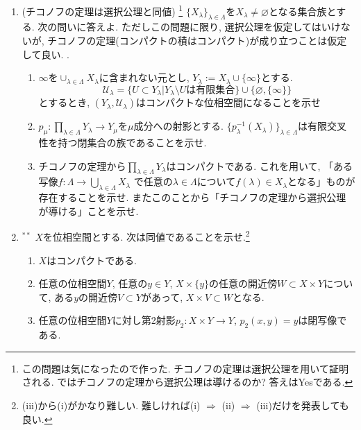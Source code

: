 \documentclass[dvipdfmx,a4paper,11pt]{article}
\newcommand{\R}{\mathbb{R}}
\theoremstyle{definition}
\begin{document}
\begin{enumerate}[label=\textbf{問}\ref*{sec-compact}.\arabic*]
\item \label{axiom}(チコノフの定理は選択公理と同値) \footnote{この問題は気になったので作った. チコノフの定理は選択公理を用いて証明される. ではチコノフの定理から選択公理は導けるのか? 答えはYesである.}
$\{X_{\lambda} \}_{\lambda \in \Lambda}$を$X_{\lambda} \neq \varnothing$となる集合族とする.
次の問いに答えよ. ただしこの問題に限り, 選択公理を仮定してはいけないが, チコノフの定理(コンパクトの積はコンパクト)が成り立つことは仮定して良い. .
\begin{enumerate}
 \setlength{\parskip}{0cm}
  \setlength{\itemsep}{0pt} 
\item $\infty$を$\cup_{\lambda \in \Lambda} X_{\lambda}$に含まれない元とし, $Y_{\lambda}:= X_{\lambda} \cup \{ \infty\}$とする.
$$
\mathscr{U}_\lambda = \{U \subset Y_{\lambda} | \text{$Y_{\lambda} \setminus U$は有限集合} \} \cup \{  \varnothing , \{ \infty\} \}
$$
とするとき, $(Y_{\lambda}, \mathscr{U}_\lambda)$はコンパクトな位相空間になることを示せ
\item $p_{\mu}: \prod_{\lambda \in \Lambda} Y_{\lambda} \to Y_{\mu}$を$\mu$成分への射影とする. $\{ p_{\lambda}^{-1}(X_{\lambda})\}_{\lambda \in \Lambda}$は有限交叉性を持つ閉集合の族であることを示せ.
\item チコノフの定理から$\prod_{\lambda \in \Lambda} Y_{\lambda} $はコンパクトである. 
これを用いて, 「ある写像$f : \Lambda \to \bigcup_{\lambda \in \Lambda} X_{\lambda}$
で任意の$\lambda \in \Lambda$について$f(\lambda) \in X_{\lambda}$となる」ものが存在することを示せ. またこのことから「チコノフの定理から選択公理が導ける」ことを示せ. 
\end{enumerate}



\item $^{**}$ $X$を位相空間とする. 次は同値であることを示せ.\footnote{(iii)から(i)がかなり難しい. 難しければ(i) $\Rightarrow$ (ii) $\Rightarrow$ (iii)だけを発表しても良い. }
\begin{enumerate}[label=(\roman*)]
 \setlength{\parskip}{0cm}
  \setlength{\itemsep}{0pt} 
\item  $X$はコンパクトである.
\item 任意の位相空間$Y$, 任意の$y \in Y$, $X \times \{ y\}$の任意の開近傍$W \subset X \times Y$について, ある$y$の開近傍$V \subset Y$があって, $X \times V \subset W$となる.
\item 任意の位相空間$Y$に対し第2射影$p_{2} : X \times Y \rightarrow Y$, $p_2(x,y)=y$は閉写像である. 
\end{enumerate}



 \end{enumerate}
\end{document}
